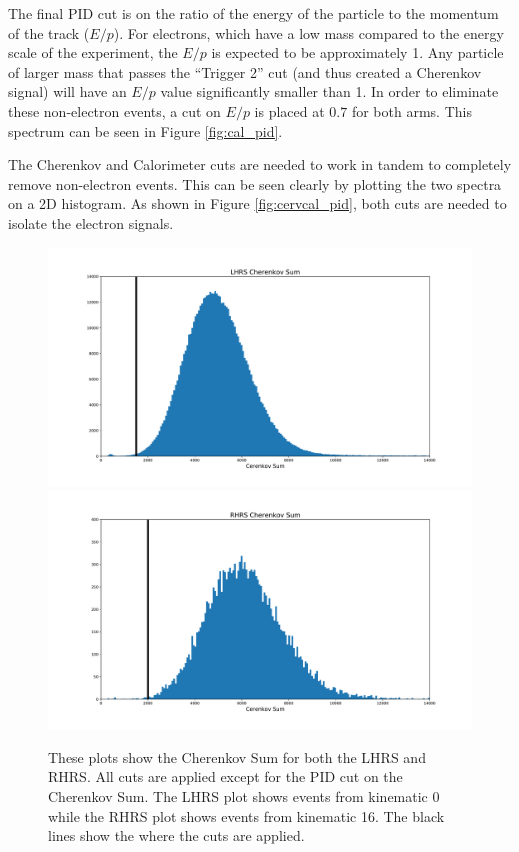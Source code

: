 The final PID cut is on the ratio of the energy of the particle to the momentum of the track ($E/p$). For electrons, which have a low mass compared to the energy scale of the experiment, the $E/p$ is expected to be approximately 1. Any particle of larger mass that passes the ``Trigger 2'' cut (and thus created a Cherenkov signal) will have an $E/p$ value significantly smaller than 1. In order to eliminate these non-electron events, a cut on $E/p$ is placed at $0.7$ for both arms. This spectrum can be seen in Figure \ref{fig:cal_pid}.

The Cherenkov and Calorimeter cuts are needed to work in tandem to completely remove non-electron events. This can be seen clearly by plotting the two spectra on a 2D histogram. As shown in Figure \ref{fig:cervcal_pid}, both cuts are needed to isolate the electron signals.

\begin{figure}
\begin{center}
	\includegraphics[width=\textwidth]{./analysis/fig/LCer_pid.pdf}
	\includegraphics[width=\textwidth]{./analysis/fig/RCer_pid.pdf}
	\caption{These plots show the Cherenkov Sum for both the LHRS and RHRS. All cuts are applied except for the PID cut on the Cherenkov Sum. The LHRS plot shows events from kinematic 0 while the RHRS plot shows events from kinematic 16. The black lines show the where the cuts are applied.}
	\label{fig:cer_pid}
\end{center}
\end{figure}


